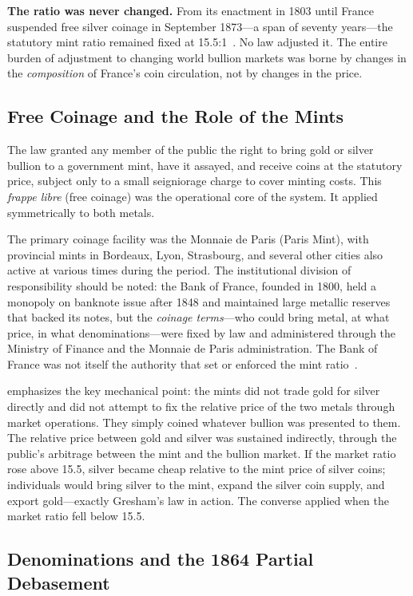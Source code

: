 \documentclass[12pt,letterpaper]{article}
\begin{document}
\textbf{The ratio was never changed.}  From its enactment in 1803 until France
suspended free silver coinage in September 1873---a span of seventy years---the
statutory mint ratio remained fixed at 15.5:1~\citep{oppers2000,flandreau2004}.
No law adjusted it.  The entire burden of adjustment to changing world bullion
markets was borne by changes in the \emph{composition} of France's coin
circulation, not by changes in the price.

\subsection{Free Coinage and the Role of the Mints}

The law granted any member of the public the right to bring gold or silver bullion
to a government mint, have it assayed, and receive coins at the statutory price,
subject only to a small seigniorage charge to cover minting costs.  This
\emph{frappe libre} (free coinage) was the operational core of the system.  It
applied symmetrically to both metals.

The primary coinage facility was the Monnaie de Paris (Paris Mint), with provincial
mints in Bordeaux, Lyon, Strasbourg, and several other cities also active at
various times during the period.  The institutional division of responsibility
should be noted: the Bank of France, founded in 1800, held a monopoly on banknote
issue after 1848 and maintained large metallic reserves that backed its notes, but
the \emph{coinage terms}---who could bring metal, at what price, in what
denominations---were fixed by law and administered through the Ministry of Finance
and the Monnaie de Paris administration.  The Bank of France was not itself the
authority that set or enforced the mint ratio~\citep{ans2014}.

\citet{oppers2000} emphasizes the key mechanical point: the mints did not trade gold
for silver directly and did not attempt to fix the relative price of the two metals
through market operations.  They simply coined whatever bullion was presented to
them.  The relative price between gold and silver was sustained indirectly, through
the public's arbitrage between the mint and the bullion market.  If the market ratio
rose above 15.5, silver became cheap relative to the mint price of silver coins;
individuals would bring silver to the mint, expand the silver coin supply, and
export gold---exactly Gresham's law in action.  The converse applied when the market
ratio fell below 15.5.

\subsection{Denominations and the 1864 Partial Debasement}
\end{document}
